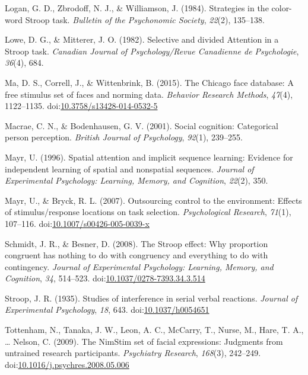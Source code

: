 \documentclass[english,,man,floatsintext]{apa6}
\begin{document}
\hypertarget{ref-logan_strategies_1984}{}
Logan, G. D., Zbrodoff, N. J., \& Williamson, J. (1984). Strategies in
the color-word Stroop task. \emph{Bulletin of the Psychonomic Society},
\emph{22}(2), 135--138.

\hypertarget{ref-lowe_selective_1982}{}
Lowe, D. G., \& Mitterer, J. O. (1982). Selective and divided Attention
in a Stroop task. \emph{Canadian Journal of Psychology/Revue Canadienne
de Psychologie}, \emph{36}(4), 684.

\hypertarget{ref-ma_chicago_2015}{}
Ma, D. S., Correll, J., \& Wittenbrink, B. (2015). The Chicago face
database: A free stimulus set of faces and norming data. \emph{Behavior
Research Methods}, \emph{47}(4), 1122--1135.
doi:\href{https://doi.org/10.3758/s13428-014-0532-5}{10.3758/s13428-014-0532-5}

\hypertarget{ref-macrae_social_2001}{}
Macrae, C. N., \& Bodenhausen, G. V. (2001). Social cognition:
Categorical person perception. \emph{British Journal of Psychology},
\emph{92}(1), 239--255.

\hypertarget{ref-mayr_spatial_1996}{}
Mayr, U. (1996). Spatial attention and implicit sequence learning:
Evidence for independent learning of spatial and nonspatial sequences.
\emph{Journal of Experimental Psychology: Learning, Memory, and
Cognition}, \emph{22}(2), 350.

\hypertarget{ref-mayr_outsourcing_2007}{}
Mayr, U., \& Bryck, R. L. (2007). Outsourcing control to the
environment: Effects of stimulus/response locations on task selection.
\emph{Psychological Research}, \emph{71}(1), 107--116.
doi:\href{https://doi.org/10.1007/s00426-005-0039-x}{10.1007/s00426-005-0039-x}

\hypertarget{ref-schmidt_stroop_2008}{}
Schmidt, J. R., \& Besner, D. (2008). The Stroop effect: Why proportion
congruent has nothing to do with congruency and everything to do with
contingency. \emph{Journal of Experimental Psychology: Learning, Memory,
and Cognition}, \emph{34}, 514--523.
doi:\href{https://doi.org/10.1037/0278-7393.34.3.514}{10.1037/0278-7393.34.3.514}

\hypertarget{ref-stroop_studies_1935}{}
Stroop, J. R. (1935). Studies of interference in serial verbal
reactions. \emph{Journal of Experimental Psychology}, \emph{18}, 643.
doi:\href{https://doi.org/10.1037/h0054651}{10.1037/h0054651}

\hypertarget{ref-tottenham_nimstim_2009}{}
Tottenham, N., Tanaka, J. W., Leon, A. C., McCarry, T., Nurse, M., Hare,
T. A., \ldots{} Nelson, C. (2009). The NimStim set of facial
expressions: Judgments from untrained research participants.
\emph{Psychiatry Research}, \emph{168}(3), 242--249.
doi:\href{https://doi.org/10.1016/j.psychres.2008.05.006}{10.1016/j.psychres.2008.05.006}
\end{document}
